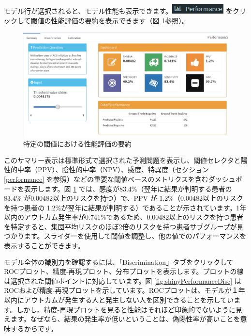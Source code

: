 \documentclass[
  11pt]{book}
\theoremstyle{definition}
\theoremstyle{definition}
\theoremstyle{definition}
\theoremstyle{definition}
\theoremstyle{remark}
\begin{document}
モデル行が選択されると、モデル性能も表示できます。\includegraphics{images/PatientLevelPrediction/performance.png} をクリックして閾値の性能評価の要約を表示できます（図 \ref{fig:shinyPerformanceSum}参照）。

\begin{figure}

{\centering \includegraphics[width=1\linewidth]{images/PatientLevelPrediction/shiny/shinyPerformanceSum} 

}

\caption{特定の閾値における性能評価の要約}\label{fig:shinyPerformanceSum}
\end{figure}

このサマリー表示は標準形式で選択された予測問題を表示し、閾値セレクタと陽性的中率（PPV）、陰性的中率（NPV）、感度、特異度（セクション \ref{performance} を参照）などの重要な閾値ベースのメトリクスを含むダッシュボードを表示します。図 \ref{fig:shinyPerformanceSum} では、感度が83.4\%（翌年に結果が判明する患者の 83.4\% が0.00482以上のリスクを持つ）で、PPV が 1.2\%（0.00482以上のリスクを持つ患者の 1.2\%が翌年に結果が判明する）であることが示されています。1年以内のアウトカム発生率が0.741\%であるため、0.00482以上のリスクを持つ患者を特定すると、集団平均リスクのほぼ2倍のリスクを持つ患者サブグループが見つかります。スライダーを使用して閾値を調整し、他の値でのパフォーマンスを表示することができます。

モデル全体の識別力を確認するには、「Discrimination」タブをクリックしてROCプロット、精度-再現プロット、分布プロットを表示します。プロットの線は選択された閾値ポイントに対応しています。図 \ref{fig:shinyPerformanceDisc} はROCおよび精度-再現プロットを示しています。ROCプロットは、モデルが１年以内にアウトカムが発生する人と発生しない人を区別できることを示しています。しかし、精度-再現プロットを見ると性能はそれほど印象的でないように見えます。なぜなら、結果の発生率が低いということは、偽陽性率が高いことを意味するからです。
\end{document}
